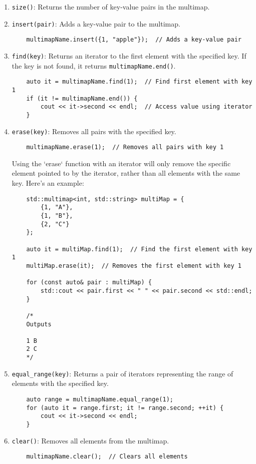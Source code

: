 \documentclass{article}
\begin{document}
\begin{enumerate}
    \item \texttt{size()}: Returns the number of key-value pairs in the multimap.
    \item \texttt{insert(pair)}: Adds a key-value pair to the multimap.
    \begin{lstlisting}
    multimapName.insert({1, "apple"});  // Adds a key-value pair
    \end{lstlisting}
    \item \texttt{find(key)}: Returns an iterator to the first element with the specified key. If the key is not found, it returns \texttt{multimapName.end()}.
    \begin{lstlisting}
    auto it = multimapName.find(1);  // Find first element with key 1
    if (it != multimapName.end()) {
        cout << it->second << endl;  // Access value using iterator
    }
    \end{lstlisting}
    \item \texttt{erase(key)}: Removes all pairs with the specified key.
    \begin{lstlisting}
    multimapName.erase(1);  // Removes all pairs with key 1
    \end{lstlisting}
    Using the `erase` function with an iterator will only remove the specific element pointed to by the iterator, rather than all elements with the same key. Here's an example:
    \begin{lstlisting}
    std::multimap<int, std::string> multiMap = {
        {1, "A"},
        {1, "B"},
        {2, "C"}
    };

    auto it = multiMap.find(1);  // Find the first element with key 1
    multiMap.erase(it);  // Removes the first element with key 1

    for (const auto& pair : multiMap) {
        std::cout << pair.first << " " << pair.second << std::endl;
    }
    
    /*
    Outputs
    
    1 B
    2 C
    */
    \end{lstlisting}
    \item \texttt{equal\_range(key)}: Returns a pair of iterators representing the range of elements with the specified key.
    \begin{lstlisting}
    auto range = multimapName.equal_range(1);
    for (auto it = range.first; it != range.second; ++it) {
        cout << it->second << endl;
    }
    \end{lstlisting}
    \item \texttt{clear()}: Removes all elements from the multimap.
    \begin{lstlisting}
    multimapName.clear();  // Clears all elements
    \end{lstlisting}
\end{enumerate}
\end{document}
